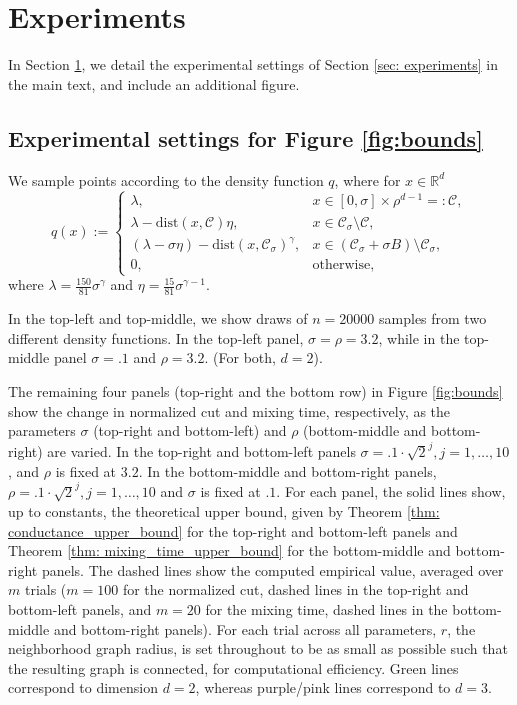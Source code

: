\documentclass[11pt,twoside]{article}
\newcommand{\Reals}{\mathbb{R}}
\newcommand{\Rd}{\Reals^d}
\newcommand{\1}{\mathbbm{1}}
\newcommand{\dist}{\mathrm{dist}}
\newcommand{\Cset}{\mathcal{C}}
\newcommand{\Csig}{\Cset_{\sigma}}
\begin{document}
\section{Experiments}
\label{sec: experimental_setting}

In Section \ref{sec: experimental_setting}, we detail the experimental settings of Section \ref{sec: experiments} in the main text, and include an additional figure. 

\subsection{Experimental settings for Figure \ref{fig:bounds}}
We sample points according to the density function $q$, where for $x \in \Rd$
\begin{equation}
q(x) :=
\begin{cases}
\lambda,~ & x \in [0,\sigma] \times \rho^{d-1} =: \Cset, \\
\lambda - \dist(x,\Cset)\eta,~ & x \in \Csig \setminus \Cset, \\
(\lambda - \sigma \eta) - \dist(x,\Csig)^{\gamma}, & x \in (\Csig + \sigma B) \setminus \Csig, \\
0,~ & \textrm{otherwise},
\end{cases}
\end{equation}
where $\lambda = \frac{150}{81} \sigma^{\gamma}$ and $\eta = \frac{15}{81} \sigma^{\gamma - 1}$.

In the top-left and top-middle, we show draws of $n = 20000$ samples from two different density functions. In the top-left panel, $\sigma = \rho = 3.2$, while in the top-middle panel $\sigma = .1$ and $\rho = 3.2$. (For both, $d = 2$).

The remaining four panels (top-right and the bottom row) in Figure \ref{fig:bounds} show the change in normalized cut and mixing time, respectively, as the parameters $\sigma$ (top-right and bottom-left) and $\rho$ (bottom-middle and bottom-right) are varied. In the top-right and bottom-left panels $\sigma = .1 \cdot \sqrt{2}^j, j = 1,\ldots,10$, and $\rho$ is fixed at $3.2$. In the bottom-middle and bottom-right panels, $\rho = .1 \cdot \sqrt{2}^j, j = 1,\ldots,10$ and $\sigma$ is fixed at $.1$.
For each panel, the solid lines show, up to constants, the theoretical upper bound, given by Theorem \ref{thm: conductance_upper_bound} for the top-right and bottom-left panels and Theorem \ref{thm: mixing_time_upper_bound} for the bottom-middle and bottom-right panels. The dashed lines show the computed empirical value, averaged over $m$ trials ($m = 100$ for the normalized cut, dashed lines in the top-right and bottom-left panels, and $m = 20$ for the mixing time, dashed lines in the bottom-middle and bottom-right panels). For each trial across all parameters, $r$, the neighborhood graph radius, is set throughout to be as small as possible such that the resulting graph is connected, for computational efficiency. Green lines correspond to dimension $d = 2$, whereas purple/pink lines correspond to $d = 3$. 
\end{document}
